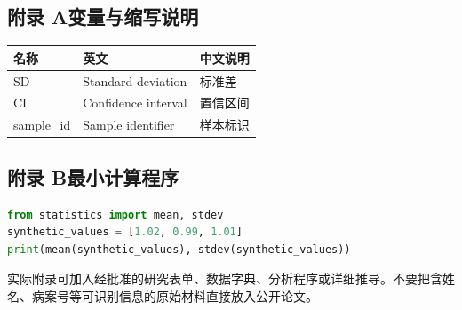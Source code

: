 \subsection*{附录 A\quad 变量与缩写说明}
\begin{longtable}{lll}\toprule 名称 & 英文 & 中文说明\\\midrule\endhead
SD & Standard deviation & 标准差\\
CI & Confidence interval & 置信区间\\
sample\_id & Sample identifier & 样本标识\\\bottomrule
\end{longtable}
\subsection*{附录 B\quad 最小计算程序}
\begin{lstlisting}[language=Python]
from statistics import mean, stdev
synthetic_values = [1.02, 0.99, 1.01]
print(mean(synthetic_values), stdev(synthetic_values))
\end{lstlisting}
实际附录可加入经批准的研究表单、数据字典、分析程序或详细推导。不要把含姓名、病案号等可识别信息的原始材料直接放入公开论文。
